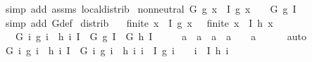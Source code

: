 \begin{isabellebody}
%
\isatagproof
{}\isamarkupfalse%
\ {\isacharparenleft}{\kern0pt}simp\ add{\isacharcolon}{\kern0pt}\ assms\ local{\isachardot}{\kern0pt}distrib{\isacharparenright}{\kern0pt}%
\endisatagproof
{\isafoldproof}%
%
\isadelimproof
\isanewline
%
\endisadelimproof
\isanewline
{}\isamarkupfalse%
\ non{\isacharunderscore}{\kern0pt}neutral{\isacharprime}{\kern0pt}{\isacharcolon}{\kern0pt}\ {\isachardoublequoteopen}G\ g\ {\isacharbraceleft}{\kern0pt}x\ {\isasymin}\ I{\isachardot}{\kern0pt}\ g\ x\ {\isasymnoteq}\ \ {\isacharequal}{\kern0pt}\ G\ g\ I{\isachardoublequoteclose}\isanewline
%
\isadelimproof
\ \ %
\endisadelimproof
%
\isatagproof
{}\isamarkupfalse%
\ {\isacharparenleft}{\kern0pt}simp\ add{\isacharcolon}{\kern0pt}\ G{\isacharunderscore}{\kern0pt}def{\isacharparenright}{\kern0pt}%
\endisatagproof
{\isafoldproof}%
%
\isadelimproof
\isanewline
%
\endisadelimproof
\isanewline
{}\isamarkupfalse%
\ distrib{\isacharprime}{\kern0pt}{\isacharcolon}{\kern0pt}\isanewline
\ \ \ {\isachardoublequoteopen}finite\ {\isacharbraceleft}{\kern0pt}x\ {\isasymin}\ I{\isachardot}{\kern0pt}\ g\ x\ {\isasymnoteq}\ \ {\isachardoublequoteopen}finite\ {\isacharbraceleft}{\kern0pt}x\ {\isasymin}\ I{\isachardot}{\kern0pt}\ h\ x\ {\isasymnoteq}\ \isanewline
\ \ \ {\isachardoublequoteopen}G\ {\isacharparenleft}{\kern0pt}{\isasymlambda}i{\isachardot}{\kern0pt}\ g\ i\ \isactrlbold {\isacharasterisk}{\kern0pt}\ h\ i{\isacharparenright}{\kern0pt}\ I\ {\isacharequal}{\kern0pt}\ G\ g\ I\ \isactrlbold {\isacharasterisk}{\kern0pt}\ G\ h\ I{\isachardoublequoteclose}\isanewline
%
\isadelimproof
%
\endisadelimproof
%
\isatagproof
{}\isamarkupfalse%
\ {\isacharminus}{\kern0pt}\isanewline
\ \ \isamarkupfalse%
\ {\isachardoublequoteopen}a\ \isactrlbold {\isacharasterisk}{\kern0pt}\ a\ {\isasymnoteq}\ a\ {\isasymLongrightarrow}\ a\ {\isasymnoteq}\ \ \ a\isanewline
\ \ \ \ \isamarkupfalse%
\ auto\isanewline
\ \ \isamarkupfalse%
\ \isamarkupfalse%
\ {\isachardoublequoteopen}G\ {\isacharparenleft}{\kern0pt}{\isasymlambda}i{\isachardot}{\kern0pt}\ g\ i\ \isactrlbold {\isacharasterisk}{\kern0pt}\ h\ i{\isacharparenright}{\kern0pt}\ I\ {\isacharequal}{\kern0pt}\ G\ {\isacharparenleft}{\kern0pt}{\isasymlambda}i{\isachardot}{\kern0pt}\ g\ i\ \isactrlbold {\isacharasterisk}{\kern0pt}\ h\ i{\isacharparenright}{\kern0pt}\ {\isacharparenleft}{\kern0pt}{\isacharbraceleft}{\kern0pt}i\ {\isasymin}\ I{\isachardot}{\kern0pt}\ g\ i\ {\isasymnoteq}\ \ {\isasymunion}\ {\isacharbraceleft}{\kern0pt}i\ {\isasymin}\ I{\isachardot}{\kern0pt}\ h\ i\ {\isasymnoteq}\ \isanewline

\end{isabellebody}
